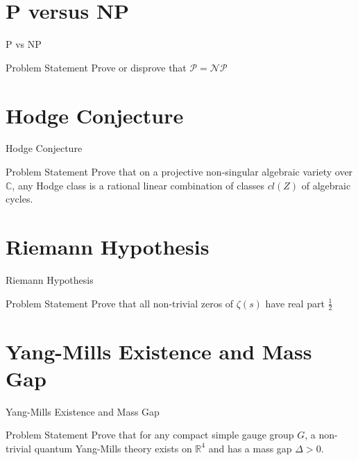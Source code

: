 \documentclass{beamer}
\newcommand{\Complex}{\mathbb{C}}
\newcommand{\Real}{\mathbb{R}}
\begin{document}
  \section{P versus NP}
  \begin{frame}{P vs NP}
      \begin{block}{Problem Statement}
          Prove or disprove that $\mathcal{P} = \mathcal{NP}$
      \end{block}
  \end{frame}

  \section{Hodge Conjecture}
  \begin{frame}{Hodge Conjecture}
      \begin{block}{Problem Statement}
          Prove that on a projective non-singular algebraic variety over
          $\Complex$, any Hodge class is a rational linear combination of
          classes $cl(Z)$ of algebraic cycles.
      \end{block}
  \end{frame}

  \section{Riemann Hypothesis}
  \begin{frame}{Riemann Hypothesis}
      \begin{block}{Problem Statement}
          Prove that all non-trivial zeros of $\zeta(s)$ have real part
          $\frac{1}{2}$
      \end{block}
  \end{frame}

  \section{Yang-Mills Existence and Mass Gap}
  \begin{frame}{Yang-Mills Existence and Mass Gap}
      \begin{block}{Problem Statement}
          Prove that for any compact simple gauge group $G$, a non-trivial
          quantum Yang-Mills theory exists on $\Real^4$ and has a mass gap
          $\Delta > 0$.
      \end{block}
  \end{frame}
\end{document}
